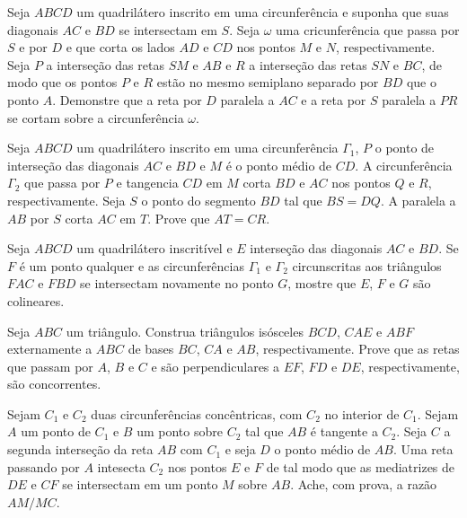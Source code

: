 \documentclass[final, 10pt, a4paper]{article}
\begin{document}
	\begin{prob}
		Seja $ABCD$ um quadrilátero inscrito em uma circunferência e suponha que suas diagonais $AC$ e $BD$ se intersectam em $S$. Seja $\omega$ uma cricunferência que passa por $S$ e por $D$ e que corta os lados $AD$ e $CD$ nos pontos $M$ e $N$, respectivamente. Seja $P$ a interseção das retas $SM$ e $AB$ e $R$ a interseção das retas $SN$ e $BC$, de modo que os pontos $P$ e $R$ estão no mesmo semiplano separado por $BD$ que o ponto $A$. Demonstre que a reta por $D$ paralela a $AC$ e a reta por $S$ paralela a $PR$ se cortam sobre a circunferência $\omega$.
	\end{prob}
	\begin{prob}
		Seja $ABCD$ um quadrilátero inscrito em uma circunferência $\Gamma_1$, $P$ o ponto de interseção das diagonais $AC$ e $BD$ e $M$ é o ponto médio de $CD$. A circunferência $\Gamma_2$ que passa por $P$ e tangencia $CD$ em $M$ corta $BD$ e $AC$ nos pontos $Q$ e $R$, respectivamente. Seja $S$ o ponto do segmento $BD$ tal que $BS=DQ$. A paralela a $AB$ por $S$ corta $AC$ em $T$. Prove que $AT = CR$.
	\end{prob}
	\begin{prob}[Banco CS 2002]
		Seja $ABCD$ um quadrilátero inscritível e $E$ interseção das diagonais $AC$ e $BD$. Se $F$ é um ponto qualquer e as circunferências $\Gamma_1$ e $\Gamma_2$ circunscritas aos triângulos $FAC$ e $FBD$ se intersectam novamente no ponto $G$, mostre que $E$, $F$ e $G$ são colineares.
	\end{prob}
	\begin{prob}[USAMO 1997]
		Seja $ABC$ um triângulo. Construa triângulos isósceles $BCD$, $CAE$ e $ABF$ externamente a $ABC$ de bases $BC$, $CA$ e $AB$, respectivamente. Prove que as retas que passam por $A$, $B$ e $C$ e são perpendiculares a $EF$, $FD$ e $DE$, respectivamente, são concorrentes.
	\end{prob}
	\begin{prob}[USAMO 1998]
		Sejam $C_1$ e $C_2$ duas circunferências concêntricas, com $C_2$ no interior de $C_1$. Sejam $A$ um ponto de $C_1$ e $B$ um ponto sobre $C_2$ tal que $AB$ é tangente a $C_2$. Seja $C$ a segunda interseção da reta $AB$ com $C_1$ e seja $D$ o ponto médio de $AB$. Uma reta passando por $A$ intesecta $C_2$ nos pontos $E$ e $F$ de tal modo que as mediatrizes de $DE$ e $CF$ se intersectam em um ponto $M$ sobre $AB$. Ache, com prova, a razão $AM/MC$.
	\end{prob}
\end{document}
